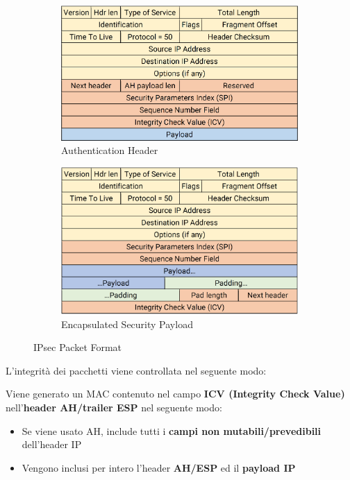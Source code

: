 \begin{figure}[h]
\centering
\begin{subfigure}{.5\textwidth}
  \centering
  \includegraphics[width=0.99\textwidth]{image/ah.png}
  \caption{Authentication Header}
  \label{fig:ah}
\end{subfigure}%
\begin{subfigure}{.5\textwidth}
  \centering
  \includegraphics[width=0.99\textwidth]{image/esp.png}
  \caption{Encapsulated Security Payload}
  \label{fig:esp}
\end{subfigure}
\caption{IPsec Packet Format}
\label{fig:ipsecpktformat}
\end{figure}
L'integrità dei pacchetti viene controllata nel seguente modo:
\begin{theorem}\label{thm:ipsectag}
Viene generato un MAC contenuto nel campo \textbf{ICV (Integrity Check Value)}  nell'\textbf{header AH/trailer ESP} nel seguente modo:
\begin{itemize}
    \item Se viene usato AH, include tutti i \textbf{campi non mutabili/prevedibili} dell'header IP\footnotemark
    \item Vengono inclusi per intero l'header \textbf{AH/ESP} ed il \textbf{payload IP}
\end{itemize}
\end{theorem}
